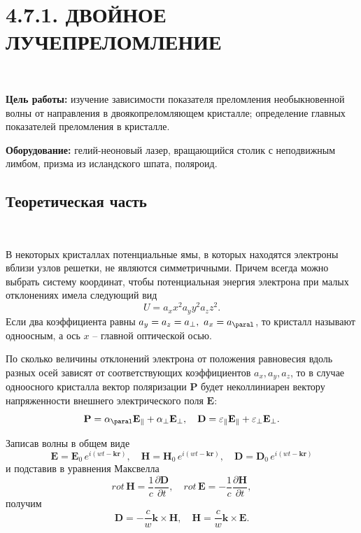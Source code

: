 \documentclass[12pt]{article}
\renewcommand{\vec}{\textbf}
\newcommand{\cross}{\times}
\begin{document}
    \section*{4.7.1. ДВОЙНОЕ ЛУЧЕПРЕЛОМЛЕНИЕ}
    \ \par
    \textbf{Цель работы:} изучение зависимости показателя преломления
    необыкновенной волны от направления в двоякопреломляющем кристалле;
    определение главных показателей преломления в кристалле.\par
    \textbf{Оборудование:} гелий-неоновый лазер, вращающийся столик с неподвижным лимбом,
    призма из исландского шпата, поляроид.

    \subsection*{Теоретическая часть}
    \ \par
    В некоторых кристаллах потенциальные ямы, в которых находятся электроны вблизи узлов решетки,
    не являются симметричными.
    Причем всегда можно выбрать систему координат, чтобы потенциальная энергия электрона при
    малых отклонениях имела следующий вид
    \[U = a_x x^2 a_y y^2 a_z z^2.\]
    Если два коэффициента равны $a_y = a_z = a_{\perp},\  a_x = a_{\paral}$, то кристалл называют
    одноосным, а ось $x$ -- главной оптической осью.

    По сколько величины отклонений электрона от положения равновесия вдоль разных осей зависят
    от соответствующих коэффициентов $a_x, a_y, a_z$, то в случае одноосного кристалла вектор поляризации $\vec{P}$
    будет неколлиниарен вектору напряженности внешнего электрического поля $\vec{E}$:
    \begin{equation}
        \label{eq:eq1}
        \vec{P} = \alpha_{\paral} \vec{E}_{\parallel} + \alpha_{\perp} \vec{E}_{\perp},\quad
        \vec{D} = \varepsilon_{\parallel} \vec{E}_{\parallel} + \varepsilon_{\perp} \vec{E}_{\perp}.
    \end{equation}

    Записав волны в общем виде
    \begin{equation*}
        \vec{E} = \vec{E}_0 \,e^{i(wt - \vec{k}\vec{r})},\quad \vec{H} = \vec{H}_0\,e^{i(wt - \vec{k}\vec{r})},\quad
        \vec{D} = \vec{D}_0\,e^{i(wt - \vec{k}\vec{r})}
    \end{equation*}
    и подставив в уравнения Максвелла
    \begin{equation*}
        rot\, \vec{H} = \frac{1}{c} \frac{\partial \vec{D}}{\partial t},\quad
        rot\, \vec{E} = -\frac{1}{c} \frac{\partial \vec{H}}{\partial t},
    \end{equation*}
    получим
    \begin{equation}
        \label{eq:eq2}
        \vec{D} = -\frac{c}{w} \vec{k} \cross \vec{H},\quad \vec{H} = \frac{c}{w} \vec{k} \cross \vec{E}.
    \end{equation}
\end{document}
